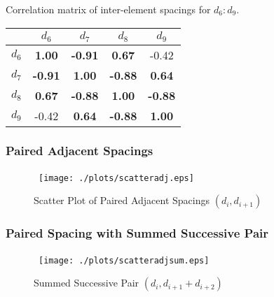 \documentclass[...]{beamer}
\begin{document}
\begin{frame}
  Correlation matrix of inter-element spacings for $d_6:d_9$.

  \begin{table}[H]\small
    \begin{center}
      \begin{tabular}{|c|cccc|}\hline
        & \textbf{$d_6$} & \textbf{$d_7$} & \textbf{$d_8$} & \textbf{$d_9$} \\ \hline
        \textbf{$d_6$} & \textbf{1.00} & \textbf{-0.91} & \textbf{0.67} & -0.42 \\
        \textbf{$d_7$} & \textbf{-0.91} & \textbf{1.00} & \textbf{-0.88} & \textbf{0.64} \\
        \textbf{$d_8$} & \textbf{0.67} & \textbf{-0.88} & \textbf{1.00} & \textbf{-0.88} \\
        \textbf{$d_9$} &  -0.42 & \textbf{0.64} & \textbf{-0.88} & \textbf{1.00} \\ \hline
      \end{tabular}
      \label{table:corr2}
    \end{center}
  \end{table}

\end{frame}

\begin{frame}
  \frametitle{Paired Adjacent Spacings}

  \begin{figure} 
    \centerline{\hbox{ \hspace{0.0in}
        \texttt{[image: ./plots/scatteradj.eps]}
      }
    }
    \caption {Scatter Plot of Paired Adjacent Spacings $(d_i, d_{i+1})$}\label{fig:scatteradj}
  \end{figure}

\end{frame}

\begin{frame}
  \frametitle{Paired Spacing with Summed Successive Pair}

  \begin{figure} 
    \centerline{\hbox{ \hspace{0.0in}
        \texttt{[image: ./plots/scatteradjsum.eps]}
      }
    }
    \caption {Summed Successive Pair $(d_i, d_{i+1}+d_{i+2})$}\label{fig:scatteradjsum}
  \end{figure}

\end{frame}
\end{document}
